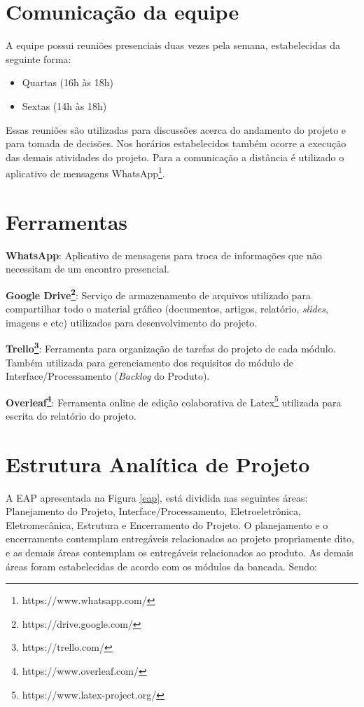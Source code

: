\section*{Comunicação da equipe}
A equipe possui reuniões presenciais duas vezes pela semana, estabelecidas da seguinte forma:
\begin{center}
  \begin{itemize}
      \item Quartas (16h às 18h)
      \item Sextas (14h às 18h)
  \end{itemize}
\end{center}

Essas reuniões são utilizadas para discussões acerca do andamento do projeto e para tomada de decisões. Nos horários estabelecidos também ocorre a execução das demais atividades do projeto. 
Para a comunicação a distância é utilizado o aplicativo de mensagens WhatsApp\footnote{https://www.whatsapp.com/}.

\section*{Ferramentas}

\textbf{WhatsApp}: 
Aplicativo de mensagens para troca de informações que não necessitam de um encontro presencial. 

\textbf{Google Drive\footnote{https://drive.google.com/}}: Serviço de armazenamento de arquivos utilizado para compartilhar todo o material gráfico (documentos, artigos, relatório, \textit{slides}, imagens e etc) utilizados para desenvolvimento do projeto.

\textbf{Trello\footnote{https://trello.com/}}:
Ferramenta para organização de tarefas do projeto de cada módulo. Também utilizada para gerenciamento dos requisitos do módulo de Interface/Processamento (\textit{Backlog} do Produto).

\textbf{Overleaf\footnote{https://www.overleaf.com/}}:
Ferramenta online de edição colaborativa de Latex\footnote{https://www.latex-project.org/} utilizada para escrita do relatório do projeto.

\section*{Estrutura Analítica de Projeto}

A EAP apresentada na Figura \ref{eap}, está dividida nas seguintes áreas: Planejamento do Projeto, Interface/Processamento, Eletroeletrônica, Eletromecânica, Estrutura e Encerramento do Projeto. O planejamento e o encerramento contemplam entregáveis relacionados ao projeto propriamente dito, e as demais áreas contemplam os entregáveis relacionados ao produto. As demais áreas foram estabelecidas de acordo com os módulos da bancada. Sendo:

